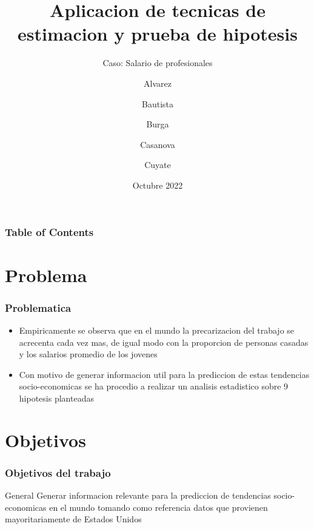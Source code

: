 \documentclass{beamer}
\title[PC1 Estadistica Aplicada] %
{Aplicacion de tecnicas de estimacion y prueba de hipotesis}
\subtitle{Caso: Salario de profesionales}
\author %
{
  Alvarez \and Bautista \and Burga \and
  Casanova \and  Cuyate
}
\institute
{
  \inst{1}%
  Facultad de Ingenieria Industrial y de Sistemas\\
  Universidad Nacional de Ingenieria
}
\date
{ Octubre 2022}
\begin{document}
\frame{\titlepage}


\begin{frame}
\frametitle{Table of Contents}
\tableofcontents
\end{frame}

\section{Problema}

\begin{frame}
\frametitle{Problematica}

\begin{itemize}
    \item Empiricamente se observa que en el mundo la precarizacion del trabajo
se acrecenta cada vez mas, de igual modo con la proporcion de personas
casadas y los salarios promedio de los jovenes
    \item Con motivo de generar informacion util para la prediccion de estas tendencias
socio-economicas se ha procedio a realizar un analisis estadistico sobre
9 hipotesis planteadas

\end{itemize}
\end{frame}



\section{Objetivos}

\begin{frame}

\frametitle{Objetivos del trabajo}

\begin{alertblock}{General}
  Generar informacion relevante para la prediccion de tendencias
  socio-economicas en el mundo tomando como referencia datos
  que provienen mayoritariamente de Estados Unidos
\end{alertblock}
\end{frame}
\end{document}

